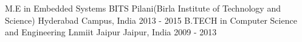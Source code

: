 

\begin{cventries}

  \cventry
    {M.E in Embedded Systems } %
    {BITS Pilani(Birla Institute of Technology and Science)} %
    {Hyderabad Campus, India} %
    {2013 - 2015} %
    {}
  \cventry
    {B.TECH in Computer Science and Engineering } %
    {Lnmiit Jaipur} %
    {Jaipur, India} %
    {2009 - 2013} %
	{}
\end{cventries}
